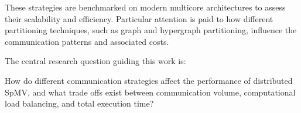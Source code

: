 These strategies are benchmarked on modern multicore architectures to assess their scalability and efficiency. Particular attention is paid to how different partitioning techniques, such as graph and hypergraph partitioning, influence the communication patterns and associated costs.
\medskip

The central research question guiding this work is:

How do different communication strategies affect the performance of distributed SpMV, and what trade offs exist between communication volume, computational load balancing, and total execution time?
